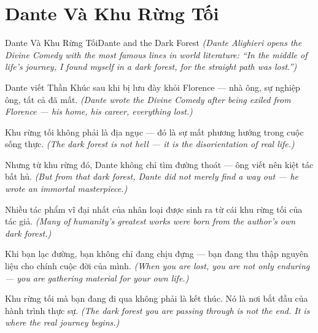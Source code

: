 \section{Dante Và Khu Rừng Tối}
\begin{truyen}{Dante Và Khu Rừng Tối}{Dante and the Dark Forest}
\textit{(Dante Alighieri opens the Divine Comedy with the most famous lines in world literature: ``In the middle of life's journey, I found myself in a dark forest, for the straight path was lost.'')}

Dante viết Thần Khúc sau khi bị lưu đày khỏi Florence — nhà ông, sự nghiệp ông, tất cả đã mất.
\textit{(Dante wrote the Divine Comedy after being exiled from Florence — his home, his career, everything lost.)}

Khu rừng tối không phải là địa ngục — đó là sự mất phương hướng trong cuộc sống thực.
\textit{(The dark forest is not hell — it is the disorientation of real life.)}

Nhưng từ khu rừng đó, Dante không chỉ tìm đường thoát — ông viết nên kiệt tác bất hủ.
\textit{(But from that dark forest, Dante did not merely find a way out — he wrote an immortal masterpiece.)}

Nhiều tác phẩm vĩ đại nhất của nhân loại được sinh ra từ cái khu rừng tối của tác giả.
\textit{(Many of humanity's greatest works were born from the author's own dark forest.)}

Khi bạn lạc đường, bạn không chỉ đang chịu đựng — bạn đang thu thập nguyên liệu cho chính cuộc đời của mình.
\textit{(When you are lost, you are not only enduring — you are gathering material for your own life.)}

\end{truyen}

\begin{baihoc}
Khu rừng tối mà bạn đang đi qua không phải là kết thúc. Nó là nơi bắt đầu của hành trình thực sự.
\textit{(The dark forest you are passing through is not the end. It is where the real journey begins.)}
\end{baihoc}
\ngancach

